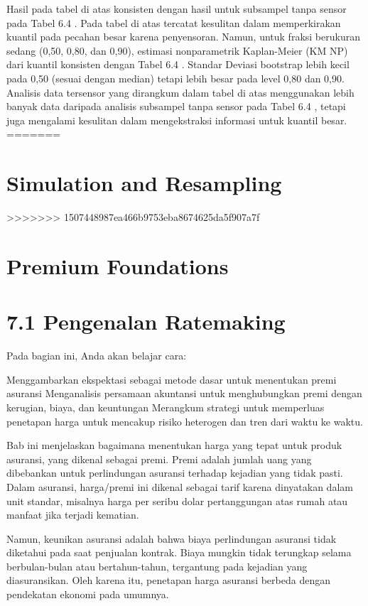 \documentclass[
]{book}
\begin{document}
Hasil pada tabel di atas konsisten dengan hasil untuk subsampel tanpa sensor pada Tabel 6.4 . Pada tabel di atas tercatat kesulitan dalam memperkirakan kuantil pada pecahan besar karena penyensoran. Namun, untuk fraksi berukuran sedang (0,50, 0,80, dan 0,90), estimasi nonparametrik Kaplan-Meier (KM NP) dari kuantil konsisten dengan Tabel 6.4 . Standar Deviasi bootstrap lebih kecil pada 0,50 (sesuai dengan median) tetapi lebih besar pada level 0,80 dan 0,90. Analisis data tersensor yang dirangkum dalam tabel di atas menggunakan lebih banyak data daripada analisis subsampel tanpa sensor pada Tabel 6.4 , tetapi juga mengalami kesulitan dalam mengekstraksi informasi untuk kuantil besar.
=======
\hypertarget{simulation-and-resampling}{%
\chapter{Simulation and Resampling}\label{simulation-and-resampling}}
>>>>>>> 1507448987ea466b9753eba8674625da5f907a7f

\hypertarget{premium-foundations}{%
\chapter{Premium Foundations}\label{premium-foundations}}

\hypertarget{pengenalan-ratemaking}{%
\chapter{7.1 Pengenalan Ratemaking}\label{pengenalan-ratemaking}}

Pada bagian ini, Anda akan belajar cara:

Menggambarkan ekspektasi sebagai metode dasar untuk menentukan premi asuransi
Menganalisis persamaan akuntansi untuk menghubungkan premi dengan kerugian, biaya, dan keuntungan
Merangkum strategi untuk memperluas penetapan harga untuk mencakup risiko heterogen dan tren dari waktu ke waktu.

Bab ini menjelaskan bagaimana menentukan harga yang tepat untuk produk asuransi, yang dikenal sebagai premi. Premi adalah jumlah uang yang dibebankan untuk perlindungan asuransi terhadap kejadian yang tidak pasti. Dalam asuransi, harga/premi ini dikenal sebagai tarif karena dinyatakan dalam unit standar, misalnya harga per seribu dolar pertanggungan atas rumah atau manfaat jika terjadi kematian.

Namun, keunikan asuransi adalah bahwa biaya perlindungan asuransi tidak diketahui pada saat penjualan kontrak. Biaya mungkin tidak terungkap selama berbulan-bulan atau bertahun-tahun, tergantung pada kejadian yang diasuransikan. Oleh karena itu, penetapan harga asuransi berbeda dengan pendekatan ekonomi pada umumnya.
\end{document}
